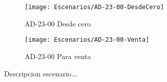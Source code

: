 \begin{figure}[H]
    \centering
    \begin{minipage}[b]{0.4\textwidth}
        \texttt{[image: Escenarios/AD-23-00-DesdeCero]}
        \caption{AD-23-00 Desde cero}
        \label{fig:AD-23-00}
    \end{minipage}
    \hfill
    \begin{minipage}[b]{0.4\textwidth}
        \texttt{[image: Escenarios/AD-23-00-Venta]}
        \caption{AD-23-00 Para venta}
        \label{fig:AD-23-00}
    \end{minipage}
    \end{figure}

Descripcion escenario...
\clearpage
